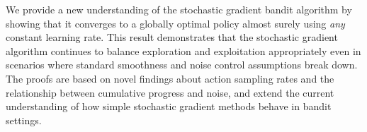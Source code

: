 
We provide a new understanding of the stochastic gradient bandit algorithm by showing that it converges to a globally optimal policy almost surely
using \emph{any} constant learning rate.
This result demonstrates that the stochastic gradient algorithm continues to balance exploration and exploitation
appropriately even in scenarios where standard smoothness and noise control
assumptions break down.
The proofs are based on novel findings about action sampling rates and the
relationship between cumulative progress and noise,
and extend the current understanding of how simple stochastic gradient methods
behave in bandit settings.

